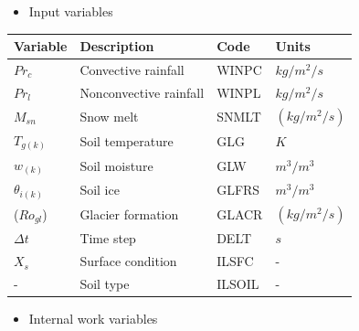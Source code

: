 \begin{itemize}
\tightlist
\item
  Input variables
\end{itemize}

\begin{longtable}[]{@{}llll@{}}
\toprule\noalign{}
Variable & Description & Code & Units \\
\midrule\noalign{}
\endhead
\bottomrule\noalign{}
\endlastfoot
\(Pr_c\) & Convective rainfall & WINPC & \(kg/m^2/s\) \\
\(Pr_l\) & Nonconvective rainfall & WINPL & \(kg/m^2/s\) \\
\(M_{sn}\) & Snow melt & SNMLT & \((kg/m^2/s)\) \\
\(T_{g(k)}\) & Soil temperature & GLG & \(K\) \\
\(w_{(k)}\) & Soil moisture & GLW & \(m^3/m^3\) \\
\(\theta_{i(k)}\) & Soil ice & GLFRS & \(m^3/m^3\) \\
(\(Ro_{gl}\)) & Glacier formation & GLACR & \((kg/m^2/s)\) \\
\(\Delta t\) & Time step & DELT & \(s\) \\
\(X_s\) & Surface condition & ILSFC & - \\
- & Soil type & ILSOIL & - \\
\end{longtable}

\begin{itemize}
\tightlist
\item
  Internal work variables
\end{itemize}

